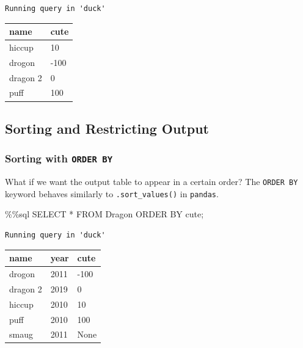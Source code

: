 \documentclass[
  letterpaper,
  DIV=11,
  numbers=noendperiod]{scrreprt}
\newenvironment{Shaded}{\begin{snugshade}}{\end{snugshade}}
\newcommand{\NormalTok}[1]{\textcolor[rgb]{0.00,0.23,0.31}{#1}}
\newcommand{\OperatorTok}[1]{\textcolor[rgb]{0.37,0.37,0.37}{#1}}
\begin{document}
\begin{verbatim}
Running query in 'duck'
\end{verbatim}

\begin{longtable}[]{@{}ll@{}}
\toprule\noalign{}
name & cute \\
\midrule\noalign{}
\endhead
\bottomrule\noalign{}
\endlastfoot
hiccup & 10 \\
drogon & -100 \\
dragon 2 & 0 \\
puff & 100 \\
\end{longtable}

\subsection{Sorting and Restricting
Output}\label{sorting-and-restricting-output}

\subsubsection{\texorpdfstring{Sorting with
\texttt{ORDER\ BY}}{Sorting with ORDER BY}}\label{sorting-with-order-by}

What if we want the output table to appear in a certain order? The
\texttt{ORDER\ BY} keyword behaves similarly to \texttt{.sort\_values()}
in \texttt{pandas}.

\begin{Shaded}
\begin{Highlighting}[]
\OperatorTok{\%\%}\NormalTok{sql}
\NormalTok{SELECT }\OperatorTok{*}
\NormalTok{FROM Dragon}
\NormalTok{ORDER BY cute}\OperatorTok{;}
\end{Highlighting}
\end{Shaded}

\begin{verbatim}
Running query in 'duck'
\end{verbatim}

\begin{longtable}[]{@{}lll@{}}
\toprule\noalign{}
name & year & cute \\
\midrule\noalign{}
\endhead
\bottomrule\noalign{}
\endlastfoot
drogon & 2011 & -100 \\
dragon 2 & 2019 & 0 \\
hiccup & 2010 & 10 \\
puff & 2010 & 100 \\
smaug & 2011 & None \\
\end{longtable}
\end{document}
